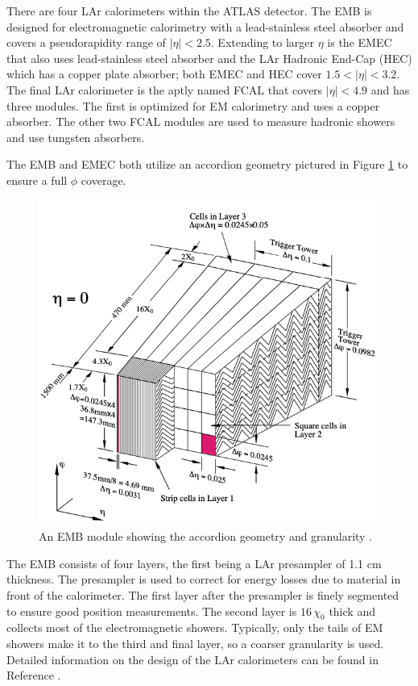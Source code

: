 			There are four \gls{LAr} calorimeters within the \gls{ATLAS} detector. The \gls{EMB} is designed for electromagnetic calorimetry with a lead-stainless steel absorber and covers a pseudorapidity range of $|\eta|<2.5$. Extending to larger $\eta$ is the \gls{EMEC} that also uses lead-stainless steel absorber and the \gls{LAr} Hadronic End-Cap (HEC) which has a copper plate absorber; both \gls{EMEC} and \gls{HEC} cover $1.5 < |\eta| < 3.2$. The final \gls{LAr} calorimeter is the aptly named \gls{FCAL} that covers $|\eta|<4.9$ and has three modules. The first is optimized for \gls{EM} calorimetry and uses a copper absorber. The other two \gls{FCAL} modules are used to measure hadronic showers and use tungsten absorbers.

			The \gls{EMB} and \gls{EMEC} both utilize an accordion geometry pictured in Figure \ref{fig:LAr-accordion} to ensure a full $\phi$ coverage. 
			\begin{figure}[!ht]{}
			\centering
			\includegraphics[width=.45\textwidth,keepaspectratio=true]{chapters/chapter3_experiment/images/LAr_Accordion_Geometry.png}
			\caption{An \gls{EMB} module showing the accordion geometry and granularity \cite{LAr-TDR}.} %
			\label{fig:LAr-accordion}
			\end{figure}
			The \gls{EMB} consists of four layers, the first being a \gls{LAr} presampler of 1.1 cm thickness. The presampler is used to correct for energy losses due to material in front of the calorimeter. The first layer after the presampler is finely segmented to ensure good position measurements. The second layer is $16 \, \chi_0$ thick and collects most of the electromagnetic showers. Typically, only the tails of \gls{EM} showers make it to the third and final layer, so a coarser granularity is used. Detailed information on the design of the \gls{LAr} calorimeters can be found in Reference \cite{LAr-TDR}.

